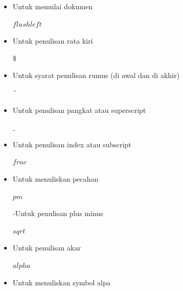 \begin{itemize}
	\item Untuk memulai dokumen\par

\vspace{\baselineskip}
$flushleft$\par

	\item Untuk penulisan rata kiri\par

\vspace{\baselineskip}
$\$$\par

	\item Untuk syarat penulisan rumus (di awal dan di akhir)\par

\vspace{\baselineskip}
$ \string^ $\par

	\item Untuk penulisan pangkat atau superscript\par

\vspace{\baselineskip}
$ \_ $\par

	\item Untuk penulisan index atau subscript\par

\vspace{\baselineskip}
$frac$\par

	\item Untuk menuliskan pecahan\par

\vspace{\baselineskip}
$pm$\par

-Untuk penulisan plus minus\par

\vspace{\baselineskip}
$sqrt$\par

	\item Untuk penulisan akar\par

\vspace{\baselineskip}
$alpha$\par

\vspace{\baselineskip}
	\item Untuk menuliskan symbol alpa
	
\end{itemize}\par

